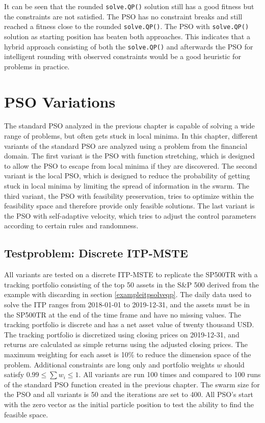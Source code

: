 \documentclass[
  oneside]{book}
\begin{document}
It can be seen that the rounded \texttt{solve.QP()} solution still has a good fitness but the constraints are not satisfied. The PSO has no constraint breaks and still reached a fitness close to the rounded \texttt{solve.QP()}. The PSO with \texttt{solve.QP()} solution as starting position has beaten both approaches. This indicates that a hybrid approach consisting of both the \texttt{solve.QP()} and afterwards the PSO for intelligent rounding with observed constraints would be a good heuristic for problems in practice.

\hypertarget{pso-variations}{%
\chapter{PSO Variations}\label{pso-variations}}

The standard PSO analyzed in the previous chapter is capable of solving a wide range of problems, but often gets stuck in local minima. In this chapter, different variants of the standard PSO are analyzed using a problem from the financial domain. The first variant is the PSO with function stretching, which is designed to allow the PSO to escape from local minima if they are discovered. The second variant is the local PSO, which is designed to reduce the probability of getting stuck in local minima by limiting the spread of information in the swarm. The third variant, the PSO with feasibility preservation, tries to optimize within the feasibility space and therefore provide only feasible solutions. The last variant is the PSO with self-adaptive velocity, which tries to adjust the control parameters according to certain rules and randomness.

\hypertarget{testproblem-discrete-itp-mste}{%
\section{Testproblem: Discrete ITP-MSTE}\label{testproblem-discrete-itp-mste}}

All variants are tested on a discrete ITP-MSTE to replicate the SP500TR with a tracking portfolio consisting of the top 50 assets in the S\&P 500 derived from the example with discarding in section \ref{exampleitpsolveqp}. The daily data used to solve the ITP ranges from 2018-01-01 to 2019-12-31, and the assets must be in the SP500TR at the end of the time frame and have no missing values. The tracking portfolio is discrete and has a net asset value of twenty thousand USD. The tracking portfolio is discretized using closing prices on 2019-12-31, and returns are calculated as simple returns using the adjusted closing prices. The maximum weighting for each asset is 10\% to reduce the dimension space of the problem. Additional constraints are long only and portfolio weights \(w\) should satisfy \(0.99 \leq \textstyle\sum w_i \leq 1\). All variants are run 100 times and compared to 100 runs of the standard PSO function created in the previous chapter. The swarm size for the PSO and all variants is 50 and the iterations are set to 400. All PSO's start with the zero vector as the initial particle position to test the ability to find the feasible space.
\end{document}
